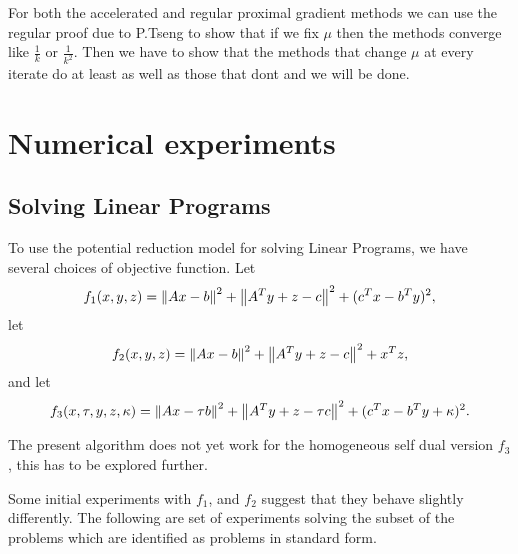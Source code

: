 \documentclass[smallextended]{svjour3}       %
\newcounter{sent}
\begin{document}
 For both the accelerated and regular proximal gradient methods we can use the
 regular proof due to P.Tseng to show that if we fix $\mu$ then the methods
 converge like $\frac{1}{k}$ or $\frac{1}{k^2}$.  Then we have to show that the
 methods that change $\mu$ at every iterate do at least as well as those that
 dont and we will be done.

 \section{Numerical experiments}
 \subsection{Solving Linear Programs}
 To use the potential reduction model for solving Linear Programs, 
 we have several choices of objective function.
 Let 
 \[
 f_1(x,y,z) = \left\| Ax-b \right\|^2 + \left\| A^Ty+z-c \right\|^2 + (c^Tx-b^Ty)^2,
 \]
 let 
  \[
 f_2(x,y,z) = \left\| Ax-b \right\|^2 + \left\| A^Ty+z-c \right\|^2 + x^Tz, 
 \]
 and let
  \[
 f_3(x,\tau,y,z,\kappa) = \left\| Ax-\tau b \right\|^2 + \left\| A^Ty+z-\tau c \right\|^2 + (c^Tx-b^Ty+\kappa)^2.
 \]

 The present algorithm does not yet work for the homogeneous self dual version $f_3$, this 
 has to be explored further.

 Some initial experiments with $f_1$, and $f_2$ suggest that they behave slightly differently.
  The following are set of experiments solving the subset of the \netlib problems which 
  are identified as problems in standard form.
\end{document}
